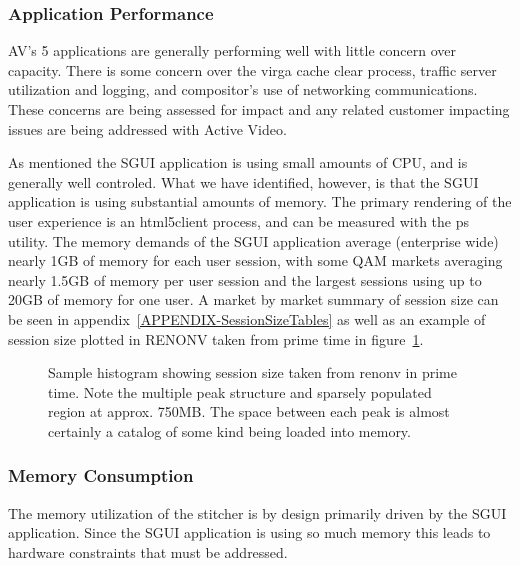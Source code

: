 \documentclass{article}
\begin{document}
\subsubsection{Application Performance}
\label{SECTION-APPPerf}

AV's 5 applications are generally performing well with little concern over capacity. There is some concern over the virga cache clear process, traffic server utilization and logging, and compositor's use of networking communications. These concerns are being assessed for impact and any related customer impacting issues are being addressed with Active Video. 

As mentioned the SGUI application is using small amounts of CPU, and is generally well controled. What we have identified, however, is that the SGUI application is using substantial amounts of memory. The primary rendering of the user experience is an html5client process, and can be measured with the ps utility. The memory demands of the SGUI application average (enterprise wide) nearly 1GB of memory for each user session, with some QAM markets averaging nearly 1.5GB of memory per user session and the largest sessions using up to 20GB of memory for one user. A market by market summary of session size can be seen in appendix~\ref{APPENDIX-SessionSizeTables} as well as an example of session size plotted in RENONV taken from prime time in figure~\ref{FIGURE-SessionSizeMem}.

\begin{figure}[!htb]
        \caption{\label{FIGURE-SessionSizeMem} Sample histogram showing session size taken from renonv in prime time. Note the multiple peak structure and sparsely populated region at approx. 750MB. The space between each peak is almost certainly a catalog of some kind being loaded into memory.}
\end{figure}

\subsubsection{Memory Consumption}
\label{SECTION-Memory}

The memory utilization of the stitcher is by design primarily driven by the SGUI application. Since the SGUI application is using so much memory this leads to hardware constraints that must be addressed. 
\end{document}
